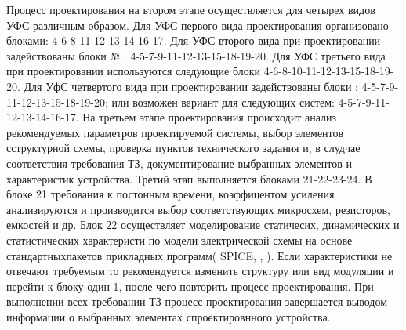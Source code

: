     Процесс проектирования на втором этапе осуществляется для четырех видов УФС различным образом.
    Для УФС первого вида проектирования организовано блоками: 4-6-8-11-12-13-14-16-17.
    Для УФС второго вида при проектировании задействованы блоки № : 4-5-7-9-11-12-13-15-18-19-20.
    Для УФС третьего вида при проектировании используются следующие блоки 4-6-8-10-11-12-13-15-18-19-20.
    Для УфС четвертого вида при проектировании задействованы блоки : 4-5-7-9-11-12-13-15-18-19-20; или возможен вариант для следующих систем: 4-5-7-9-11-12-13-14-16-17.
    На третьем этапе проектирования происходит анализ рекомендуемых параметров  проектируемой системы, выбор элементов сструктурной схемы, проверка пунктов технического задания и, в слудчае соответствия требования ТЗ, документирование выбранных элементов и характеристик устройства. Третий этап выполняется блоками 21-22-23-24. В блоке 21 требования к постонным времени, коэффицентом усиления анализируются и производится выбор соответствующих микросхем, резисторов, емкостей и др. Блок 22 осуществляет моделирование статичесих, динамических и статистических характеристи по модели электрической схемы на основе стандартныхпакетов прикладных программ( SPICE,     ,     ).
    Если характеристики не отвечают требуемым то рекомендуется изменить структуру или вид модуляции и перейти к блоку один 1, после чего повторить процесс проектирования. При выполнении всех требовании ТЗ процесс проектирования завершается выводом информации о выбранных элементах спроектировнного устройства.